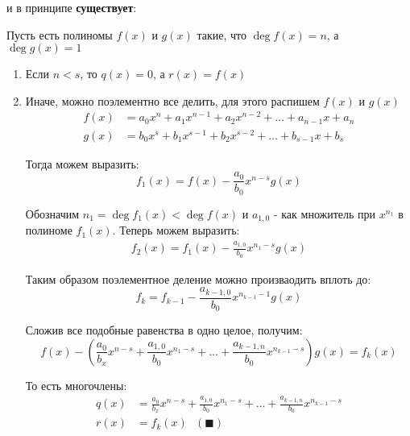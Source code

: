 \documentclass[class=article,a4paper,12pt,crop=false]{standalone}
\begin{document}
\begin{enumerate}
{        и в принципе \textbf{существует}:

        Пусть есть полиномы $f(x)$ и $g(x)$ такие, что $\deg{f(x)} = n$, а $\deg{g(x)} = 1$

        \begin{enumerate}
            \item {
                Если $n < s$, то $q(x) = 0$, а $r(x) = f(x)$
            }
            \item {
                Иначе, можно поэлементно все делить, для этого распишем $f(x)$ и $g(x)$
                \begin{equation}
                    \begin{aligned}
                        f(x) &= a_0x^n + a_1x^{n-1} + a_2x^{n-2} + \dots + a_{n-1}x + a_n\\
                        g(x) &= b_0x^s + b_1x^{s-1} + b_2x^{s-2} + \dots + b_{s-1}x + b_s
                    \end{aligned}
                \end{equation}

                Тогда можем выразить:
                \begin{equation}
                    f_1(x) = f(x) - \frac{a_0}{b_0}x^{n-s}g(x)
                \end{equation}

                Обозначим $n_1 = \deg{f_1(x)} < \deg{f(x)}$ и $a_{1,0}$ - как множитель при $x^{n_1}$ в полиноме $f_1(x)$.
                Теперь можем выразить:
                \begin{eqnarray}
                    f_2(x) = f_1(x) - \frac{a_{1,0}}{b_0}x^{n_1-s}g(x)
                \end{eqnarray}

                Таким образом поэлементное деление можно произваодить вплоть до:
                \begin{equation}
                    f_{k} = f_{k-1} - \frac{a_{k-1,0}}{b_0}x^{n_{k - 1} - 1}g(x)
                \end{equation}

                Сложив все подобные равенства в одно целое, получим:
                \begin{equation}
                    f(x) - (\frac{a_0}{b_x}x^{n-s} + \frac{a_{1,0}}{b_0}x^{n_1 - s} + \dots +
                    \frac{a_{k-1,n}}{b_0}x^{n_{k-1} - s})g(x) = f_k(x)
                \end{equation}

                То есть многочлены:
                \begin{equation}
                    \begin{aligned}
                        q(x) &= \frac{a_0}{b_x}x^{n-s} + \frac{a_{1,0}}{b_0}x^{n_1 - s} + \dots +
                        \frac{a_{k-1,n}}{b_0}x^{n_{k-1} - s} \\
                        r(x) &= f_k(x) \:\:\: (\blacksquare)
                    \end{aligned}
                \end{equation}
            }
        \end{enumerate}
    }
\end{enumerate}
\end{document}
